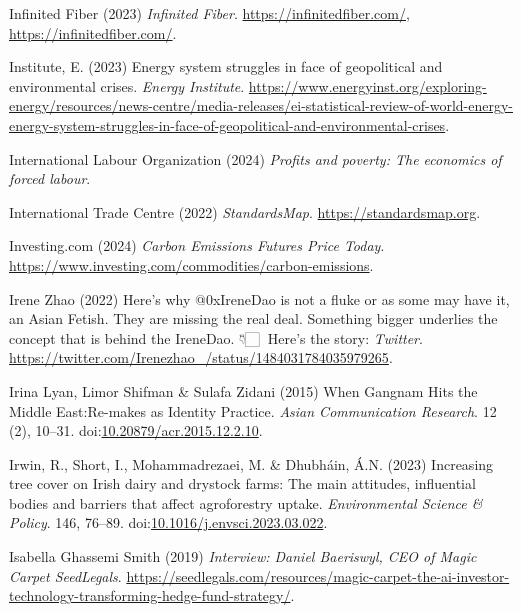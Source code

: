\documentclass[
  letterpaper,
  DIV=11,
  numbers=noendperiod]{scrartcl}
\newlength{\cslhangindent}
\newenvironment{CSLReferences}[2] %
 {\begin{list}{}{%
  \setlength{\itemindent}{0pt}
  \setlength{\leftmargin}{0pt}
  \setlength{\parsep}{0pt}
  \ifodd #1
   \setlength{\leftmargin}{\cslhangindent}
   \setlength{\itemindent}{-1\cslhangindent}
  \fi
  \setlength{\itemsep}{#2\baselineskip}}}
 {\end{list}}
\begin{document}
\begin{CSLReferences}{0}{1}
Infinited Fiber (2023) \emph{Infinited {Fiber}}.
\href{https://infinitedfiber.com/,\%20https://infinitedfiber.com/}{https://infinitedfiber.com/,
https://infinitedfiber.com/}.

Institute, E. (2023) Energy system struggles in face of geopolitical and
environmental crises. \emph{Energy Institute}.
\url{https://www.energyinst.org/exploring-energy/resources/news-centre/media-releases/ei-statistical-review-of-world-energy-energy-system-struggles-in-face-of-geopolitical-and-environmental-crises}.

International Labour Organization (2024) \emph{Profits and poverty:
{The} economics of forced labour}.

International Trade Centre (2022) \emph{{StandardsMap}}.
\url{https://standardsmap.org}.

Investing.com (2024) \emph{Carbon {Emissions Futures Price Today}}.
\url{https://www.investing.com/commodities/carbon-emissions}.

Irene Zhao (2022) Here's why @{0xIreneDao} is not a fluke or as some may
have it, an {Asian Fetish}. {They} are missing the real deal.
{Something} bigger underlies the concept that is behind the {IreneDao}.
👇🏻🧵 {Here}'s the story: \emph{Twitter}.
\url{https://twitter.com/Irenezhao_/status/1484031784035979265}.

Irina Lyan, Limor Shifman \& Sulafa Zidani (2015) When {Gangnam Hits}
the {Middle East}:{Re-makes} as {Identity Practice}. \emph{Asian
Communication Research}. 12 (2), 10--31.
doi:\href{https://doi.org/10.20879/acr.2015.12.2.10}{10.20879/acr.2015.12.2.10}.

Irwin, R., Short, I., Mohammadrezaei, M. \& Dhubháin, Á.N. (2023)
Increasing tree cover on {Irish} dairy and drystock farms: {The} main
attitudes, influential bodies and barriers that affect agroforestry
uptake. \emph{Environmental Science \& Policy}. 146, 76--89.
doi:\href{https://doi.org/10.1016/j.envsci.2023.03.022}{10.1016/j.envsci.2023.03.022}.

Isabella Ghassemi Smith (2019) \emph{Interview: {Daniel Baeriswyl},
{CEO} of {Magic Carpet} {\textbar} {SeedLegals}}.
\url{https://seedlegals.com/resources/magic-carpet-the-ai-investor-technology-transforming-hedge-fund-strategy/}.


\end{CSLReferences}
\end{document}
